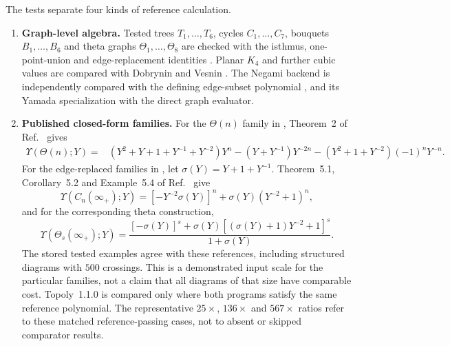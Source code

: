 \documentclass[10pt,twocolumn]{article}
\begin{document}
The tests separate four kinds of reference calculation.
\begin{enumerate}[leftmargin=*,label=\textbf{(\arabic*)}]
\item \textbf{Graph-level algebra.} Tested trees $T_1,\ldots,T_6$, cycles $C_1,\ldots,C_7$, bouquets $B_1,\ldots,B_6$ and theta graphs $\Theta_1,\ldots,\Theta_8$ are checked with the isthmus, one-point-union and edge-replacement identities \cite{kg_yamada1989,kg_li2018yamada}. Planar $K_4$ and further cubic values are compared with Dobrynin and Vesnin \cite{kg_dobrynin1996yamada}. The Negami backend is independently compared with the defining edge-subset polynomial \cite{kg_negami1987}, and its Yamada specialization with the direct graph evaluator.

\item \textbf{Published closed-form families.} For the $\Theta(n)$ family in , Theorem~2 of Ref.~\cite{kg_dobrynin1996yamada} gives
\begin{equation}
\begin{aligned}
\Upsilon(\Theta(n);Y)={}&\left(Y^2+Y+1+Y^{-1}+Y^{-2}\right)Y^n
-\left(Y+Y^{-1}\right)Y^{-2n}
-\left(Y^2+1+Y^{-2}\right)(-1)^nY^{-n}.
\end{aligned}
\label{suppeq:dv_theta_oracle}
\end{equation}
For the edge-replaced families in , let $\sigma(Y)=Y+1+Y^{-1}$. Theorem~5.1, Corollary~5.2 and Example~5.4 of Ref.~\cite{kg_li2018yamada} give
\begin{equation}
\Upsilon\!\left(C_n(\infty_+);Y\right)=\left[-Y^{-2}\sigma(Y)\right]^n+\sigma(Y)\left(Y^{-2}+1\right)^n,
\label{suppeq:li_cycle_oracle}
\end{equation}
and for the corresponding theta construction,
\begin{equation}
\Upsilon\!\left(\Theta_s(\infty_+);Y\right)=\frac{[-\sigma(Y)]^s+\sigma(Y)\left[(\sigma(Y)+1)Y^{-2}+1\right]^s}{1+\sigma(Y)}.
\label{suppeq:li_theta_oracle}
\end{equation}
The stored tested examples agree with these references, including structured diagrams with $500$ crossings. This is a demonstrated input scale for the particular families, not a claim that all diagrams of that size have comparable cost. Topoly~1.1.0 \cite{kg_topoly2021} is compared only where both programs satisfy the same reference polynomial. The representative $25\times$, $136\times$ and $567\times$ ratios refer to these matched reference-passing cases, not to absent or skipped comparator results.


\end{enumerate}
\end{document}
